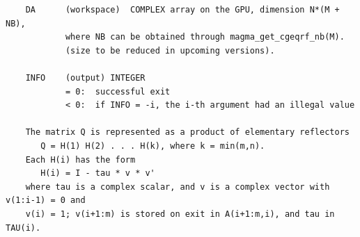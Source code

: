 \documentclass[10pt]{book}
\begin{document}
\begin{verbatim}
    DA      (workspace)  COMPLEX array on the GPU, dimension N*(M + NB), 
            where NB can be obtained through magma_get_cgeqrf_nb(M).
            (size to be reduced in upcoming versions).

    INFO    (output) INTEGER   
            = 0:  successful exit   
            < 0:  if INFO = -i, the i-th argument had an illegal value   
   
    The matrix Q is represented as a product of elementary reflectors   
       Q = H(1) H(2) . . . H(k), where k = min(m,n).   
    Each H(i) has the form   
       H(i) = I - tau * v * v'   
    where tau is a complex scalar, and v is a complex vector with v(1:i-1) = 0 and
    v(i) = 1; v(i+1:m) is stored on exit in A(i+1:m,i), and tau in TAU(i).   
\end{verbatim}

\newpage
\end{document}
